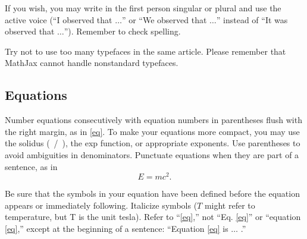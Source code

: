 \documentclass[journal,twoside,web]{ieeecolor}
\begin{document}
If you wish, you may write in the first person singular or plural and use 
the active voice (``I observed that $\ldots$'' or ``We observed that $\ldots$'' 
instead of ``It was observed that $\ldots$''). Remember to check spelling. 


Try not to use too many typefaces in the same article. Please remember that MathJax
cannot handle nonstandard typefaces.

\subsection{Equations}
Number equations consecutively with equation numbers in parentheses flush 
with the right margin, as in \eqref{eq}. To make your equations more 
compact, you may use the solidus (~/~), the exp function, or appropriate 
exponents. Use parentheses to avoid ambiguities in denominators. Punctuate 
equations when they are part of a sentence, as in
\begin{equation}E=mc^2.\label{eq}\end{equation}

Be sure that the symbols in your equation have been defined before the 
equation appears or immediately following. Italicize symbols ($T$ might refer 
to temperature, but T is the unit tesla). Refer to ``\eqref{eq},'' not ``Eq. \eqref{eq}'' 
or ``equation \eqref{eq},'' except at the beginning of a sentence: ``Equation \eqref{eq} 
is $\ldots$ .''
\end{document}
